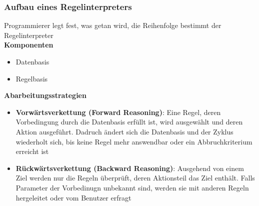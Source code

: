\documentclass[14pt]{article}
\begin{document}
\subsubsection{Aufbau eines Regelinterpreters}
Programmierer legt fest, was getan wird, die Reihenfolge bestimmt der 
Regelinterpreter \\
\textbf{Komponenten}
\begin{itemize}
    \item Datenbasis
    \item Regelbasis
\end{itemize}
\textbf{Abarbeitungsstrategien}
\begin{itemize}
    \item \textbf{Vorwärtsverkettung (Forward Reasoning)}: Eine Regel, deren 
    Vorbedingung durch die Datenbasis erfüllt ist, wird ausgewählt und deren 
    Aktion ausgeführt. Dadruch ändert sich die Datenbasis und der Zyklus
    wiederholt sich, bis keine Regel mehr answendbar oder ein Abbruchkriterium
    erreicht ist
    \item \textbf{Rückwärtsverkettung (Backward Reasoning)}: Ausgehend von einem
    Ziel werden nur die Regeln überprüft, deren Aktionsteil das Ziel enthält.
    Falls Parameter der Vorbedinugn unbekannt sind, werden sie mit anderen 
    Regeln hergeleitet oder vom Benutzer erfragt
\end{itemize}
\end{document}
